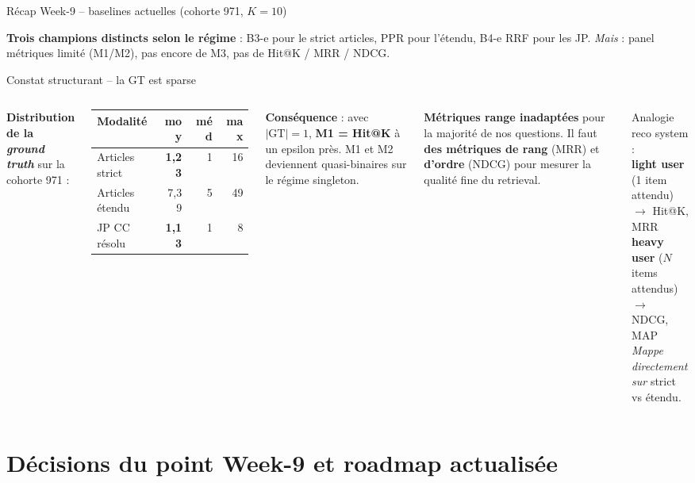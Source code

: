 \documentclass[aspectratio=169,10pt]{beamer}
\newcommand{\keybox}[1]{%
  \begin{center}
  \colorbox{accentsoft}{\parbox{0.92\linewidth}{\centering #1}}
  \end{center}}
\newcommand{\warnbox}[1]{%
  \begin{center}
  \colorbox{red!10}{\parbox{0.92\linewidth}{\centering #1}}
  \end{center}}
\begin{document}
\begin{frame}{Récap Week-9 -- baselines actuelles (cohorte 971, $K{=}10$)}
  \vspace{0.4em}
  \keybox{\scriptsize \textbf{Trois champions distincts selon le régime} :
  B3-e pour le strict articles, PPR pour l'étendu, B4-e RRF pour les JP.
  \emph{Mais} : panel métriques limité (M1/M2), pas encore de M3, pas de Hit@K / MRR / NDCG.}
\end{frame}

\begin{frame}{Constat structurant -- la GT est sparse}
  \footnotesize
  \begin{columns}[T]
    \textbf{Distribution de la \emph{ground truth}} sur la cohorte 971 :
    \vspace{0.4em}

    \renewcommand{\arraystretch}{1.2}
    \begin{tabular}{@{}l r r r@{}}
      \toprule
      \textbf{Modalité} & \textbf{moy} & \textbf{méd} & \textbf{max} \\
      \midrule
      Articles strict & \textbf{1,23} & 1 & 16 \\
      Articles étendu & 7,39 & 5 & 49 \\
      JP CC résolu    & \textbf{1,13} & 1 & 8 \\
      \bottomrule
    \end{tabular}

    \vspace{0.8em}
    \textbf{Conséquence} : avec $|\mathrm{GT}|=1$, \textbf{M1 = Hit@K} à un epsilon près.
    M1 et M2 deviennent quasi-binaires sur le régime singleton.

    \warnbox{\scriptsize \textbf{Métriques range inadaptées}
    pour la majorité de nos questions. Il faut \textbf{des métriques de rang}
    (MRR) et \textbf{d'ordre} (NDCG) pour mesurer la qualité fine du retrieval.}

    \vspace{0.4em}
    \keybox{\scriptsize Analogie reco system : \\
    \textbf{light user} (1 item attendu) $\to$ Hit@K, MRR \\
    \textbf{heavy user} ($N$ items attendus) $\to$ NDCG, MAP \\
    \emph{Mappe directement sur} strict vs étendu.}
  \end{columns}
\end{frame}

\section{Décisions du point Week-9 et roadmap actualisée}
\end{document}

